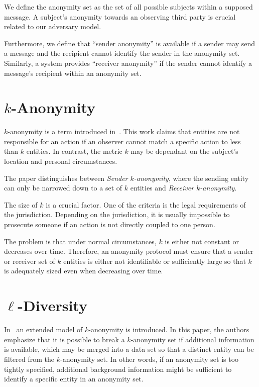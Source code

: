 We define the anonymity set as the set of all possible subjects within a supposed message. A subject's anonymity towards an observing third party is crucial related to our adversary model.

Furthermore, we define that ``sender anonymity'' is available if a sender may send a message and the recipient cannot identify the sender in the anonymity set. Similarly, a system provides ``receiver anonymity'' if the sender cannot identify a message's recipient within an anonymity set.

\section{\texorpdfstring{$k$}{k}-Anonymity}
$k$-anonymity is a term introduced in~\cite{k-anonymous:ccs2003}. This work claims that entities are not responsible for an action if an observer cannot match a specific action to less than $k$ entities. In contrast, the metric $k$ may be dependant on the subject's location and personal circumstances.

The paper distinguishes between \textit{Sender $k$-anonymity}, where the sending entity can only be narrowed down to a set of $k$ entities and \textit{Receiver $k$-anonymity}. 

The size of $k$ is a crucial factor. One of the criteria is the legal requirements of the jurisdiction. Depending on the jurisdiction, it is usually impossible to prosecute someone if an action is not directly coupled to one person. 

The problem is that under normal circumstances, $k$ is either not constant or decreases over time. Therefore, an anonymity protocol must ensure that a sender or receiver set of $k$ entities is either not identifiable or sufficiently large so that $k$ is adequately sized even when decreasing over time.

\section{\texorpdfstring{$\ell$}{l}-Diversity}
In~\cite{machanavajjhala2007diversity} an extended model of $k$-anonymity is introduced. In this paper, the authors emphasize that it is possible to break a $k$-anonymity set if additional information is available, which may be merged into a data set so that a distinct entity can be filtered from the $k$-anonymity set. In other words, if an anonymity set is too tightly specified, additional background information might be sufficient to identify a specific entity in an anonymity set.

